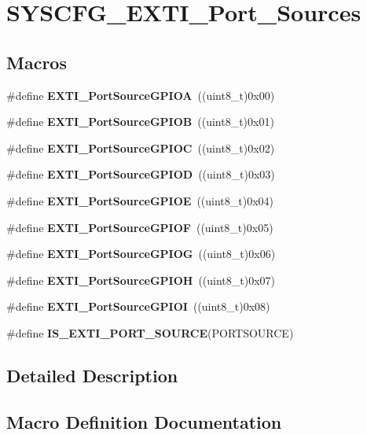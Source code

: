 \section{S\+Y\+S\+C\+F\+G\+\_\+\+E\+X\+T\+I\+\_\+\+Port\+\_\+\+Sources}
\label{group__SYSCFG__EXTI__Port__Sources}
\subsection*{Macros}
\begin{DoxyCompactItemize}
\item 
\#define \textbf{ E\+X\+T\+I\+\_\+\+Port\+Source\+G\+P\+I\+OA}~((uint8\+\_\+t)0x00)
\item 
\#define \textbf{ E\+X\+T\+I\+\_\+\+Port\+Source\+G\+P\+I\+OB}~((uint8\+\_\+t)0x01)
\item 
\#define \textbf{ E\+X\+T\+I\+\_\+\+Port\+Source\+G\+P\+I\+OC}~((uint8\+\_\+t)0x02)
\item 
\#define \textbf{ E\+X\+T\+I\+\_\+\+Port\+Source\+G\+P\+I\+OD}~((uint8\+\_\+t)0x03)
\item 
\#define \textbf{ E\+X\+T\+I\+\_\+\+Port\+Source\+G\+P\+I\+OE}~((uint8\+\_\+t)0x04)
\item 
\#define \textbf{ E\+X\+T\+I\+\_\+\+Port\+Source\+G\+P\+I\+OF}~((uint8\+\_\+t)0x05)
\item 
\#define \textbf{ E\+X\+T\+I\+\_\+\+Port\+Source\+G\+P\+I\+OG}~((uint8\+\_\+t)0x06)
\item 
\#define \textbf{ E\+X\+T\+I\+\_\+\+Port\+Source\+G\+P\+I\+OH}~((uint8\+\_\+t)0x07)
\item 
\#define \textbf{ E\+X\+T\+I\+\_\+\+Port\+Source\+G\+P\+I\+OI}~((uint8\+\_\+t)0x08)
\item 
\#define \textbf{ I\+S\+\_\+\+E\+X\+T\+I\+\_\+\+P\+O\+R\+T\+\_\+\+S\+O\+U\+R\+CE}(P\+O\+R\+T\+S\+O\+U\+R\+CE)
\end{DoxyCompactItemize}


\subsection{Detailed Description}


\subsection{Macro Definition Documentation}
\mbox{\label{group__SYSCFG__EXTI__Port__Sources_ga66aab57f683213ff74751390162c425d}} 
